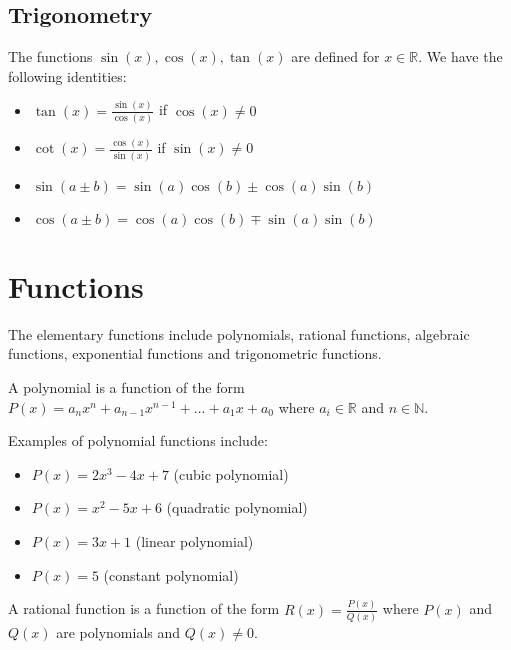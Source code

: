 \subsection{Trigonometry}
The functions $\sin(x), \cos(x), \tan(x)$ are defined for $x \in \mathbb{R}$. We have the following identities:

\begin{itemize}[itemsep=1pt,label=$\circ$]
    \item $\tan(x) = \frac{\sin(x)}{\cos(x)}$ if $\cos(x) \neq 0$
    \item $\cot(x) = \frac{\cos(x)}{\sin(x)}$ if $\sin(x) \neq 0$
    \item $\sin(a \pm b) = \sin(a)\cos(b) \pm \cos(a)\sin(b)$
    \item $\cos(a \pm b) = \cos(a)\cos(b) \mp \sin(a)\sin(b)$
\end{itemize}

\section{Functions}
The elementary functions include polynomials, rational functions, algebraic functions, exponential functions and trigonometric functions.

\begin{definition}
    A polynomial is a function of the form $P(x) = a_n x^n + a_{n-1} x^{n-1} + \ldots + a_1 x + a_0$ where $a_i \in \mathbb{R}$ and $n \in \mathbb{N}$.
\end{definition}

\begin{eg}
    Examples of polynomial functions include:
    \begin{itemize}[itemsep=1pt,label=$\circ$]
        \item $P(x) = 2x^3 - 4x + 7$ (cubic polynomial)
        \item $P(x) = x^2 - 5x + 6$ (quadratic polynomial)
        \item $P(x) = 3x + 1$ (linear polynomial)
        \item $P(x) = 5$ (constant polynomial)
    \end{itemize}
\end{eg}

\begin{definition}
    A rational function is a function of the form $R(x) = \frac{P(x)}{Q(x)}$ where $P(x)$ and $Q(x)$ are polynomials and $Q(x) \neq 0$.
\end{definition}

